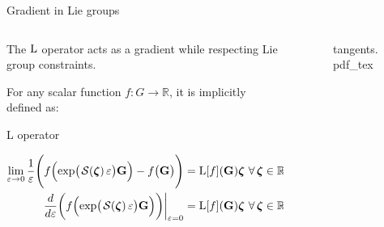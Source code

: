 \begin{frame}{Gradient in Lie groups}
\begin{columns}[c]
        \begin{column}{0.6\linewidth}
            The $\operatorname{L}$ operator acts as a gradient while respecting Lie group constraints.
            \newline

            For any scalar function $f: G \to \mathbb{R}$, it is implicitly defined as:
            \begin{exampleblock}{L operator}
                {\centering $\displaystyle 
                \begin{aligned} \lim_{\varepsilon \rightarrow 0} \frac{1}{\varepsilon} \Biggl( f\Bigl(\exp\bigl(\SL[\boldsymbol{\zeta}]\varepsilon\bigr)\mathbf{G}\Bigr) - f\bigl(\mathbf{G}\bigr) \Biggr) &= \Lop[f](\mathbf{G}) \boldsymbol{\zeta} \ \forall\, \boldsymbol{\zeta} \in \mathbb{R}^m
                \\\left.\frac{d}{d\varepsilon}\biggl(f\Bigl(\exp\bigl(\SL[\boldsymbol{\zeta}]\varepsilon\bigr)\mathbf{G}\Bigr)\biggr)\right|_{\varepsilon=0} &= \Lop[f](\mathbf{G})\boldsymbol{\zeta}\ \forall\, \boldsymbol{\zeta} \in \mathbb{R}^m
                \end{aligned}$ 
                \par}%
            \end{exampleblock}
        \end{column}
        \begin{column}{0.4\linewidth}
           \begin{figure}[ht!]
                \centering
                \def\svgwidth{\linewidth}
                {\footnotesize{tangents.pdf_tex}}
            \end{figure}
        \end{column}
    \end{columns}
    
\end{frame}

